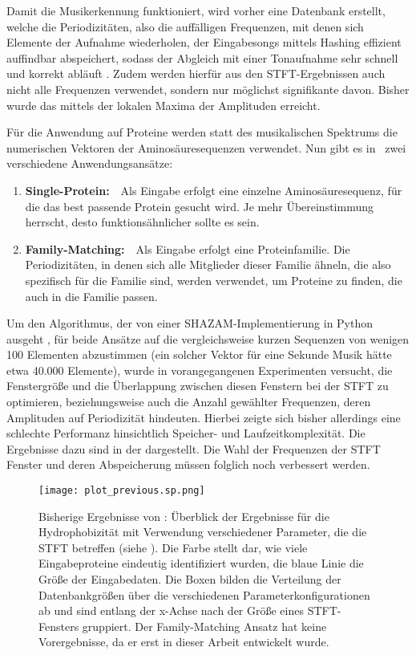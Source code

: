     Damit die Musikerkennung funktioniert, wird vorher eine Datenbank erstellt, welche die Periodizitäten, also die auffälligen Frequenzen, mit denen sich Elemente der Aufnahme wiederholen, der Eingabesongs mittels Hashing effizient auffindbar abspeichert, sodass der Abgleich mit einer Tonaufnahme sehr schnell und korrekt abläuft . Zudem werden hierfür aus den \ac{STFT}-Ergebnissen auch nicht alle Frequenzen verwendet, sondern nur möglichst signifikante davon. Bisher wurde das mittels der lokalen Maxima der Amplituden erreicht.

    Für die Anwendung auf Proteine werden statt des musikalischen Spektrums die numerischen Vektoren der Aminosäuresequenzen verwendet. Nun gibt es in \protfin\ zwei verschiedene Anwendungsansätze:
    \begin{enumerate}
        \item \textbf{Single-Protein:}\ \ Als Eingabe erfolgt eine einzelne Aminosäuresequenz, für die das best passende Protein gesucht wird. Je mehr Übereinstimmung herrscht, desto funktionsähnlicher sollte es sein.
        \item \textbf{Family-Matching:}\ \ Als Eingabe erfolgt eine Proteinfamilie. Die Periodizitäten, in denen sich alle Mitglieder dieser Familie ähneln, die also spezifisch für die Familie sind, werden verwendet, um Proteine zu finden, die auch in die Familie passen.
    \end{enumerate}
    \label{kurze_sequenzen}

    Um den Algorithmus, der von einer SHAZAM-Implementierung in Python ausgeht \autocite{blog}, für beide Ansätze auf die vergleichsweise kurzen Sequenzen von wenigen 100 Elementen abzustimmen (ein solcher Vektor für eine Sekunde Musik hätte etwa 40.000 Elemente), wurde in vorangegangenen Experimenten versucht, die Fenstergröße und die Überlappung zwischen diesen Fenstern bei der \ac{STFT} zu optimieren, beziehungsweise auch die Anzahl gewählter Frequenzen, deren Amplituden auf Periodizität hindeuten. Hierbei zeigte sich bisher allerdings eine schlechte Performanz hinsichtlich Speicher- und Laufzeitkomplexität. Die Ergebnisse dazu sind in der  dargestellt. Die Wahl der Frequenzen der \ac{STFT} Fenster und deren Abspeicherung müssen folglich noch verbessert werden.

    \begin{figure}[H]
        \texttt{[image: plot\_previous.sp.png]}
        \caption[Bisherige Ergebnisse von \protfin]{Bisherige Ergebnisse von \protfin: Überblick der Ergebnisse für die Hydrophobizität mit Verwendung verschiedener Parameter, die die \acs{STFT} betreffen (siehe ). Die Farbe stellt dar, wie viele Eingabeproteine eindeutig identifiziert wurden, die blaue Linie die Größe der Eingabedaten. Die Boxen bilden die Verteilung der Datenbankgrößen über die verschiedenen Parameterkonfigurationen ab und sind entlang der x-Achse nach der Größe eines STFT-Fensters gruppiert. Der Family-Matching Ansatz hat keine Vorergebnisse, da er erst in dieser Arbeit entwickelt wurde.}
        \label{fig:prev_results}
    \end{figure}

